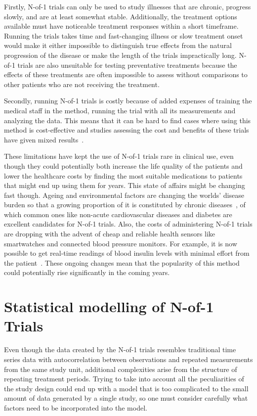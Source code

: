 \documentclass[12pt,a4paper,leqno]{report}
\theoremstyle{plain}
\theoremstyle{definition}
\theoremstyle{remark}
\begin{document}
Firstly, N-of-1 trials can only be used to study illnesses that are chronic,
progress slowly, and are at least somewhat stable. Additionally, the treatment options
available must have noticeable treatment responses within a short timeframe.
Running the trials takes time and fast-changing illness or slow
treatment onset would make it either impossible to distinguish true effects from
the natural progression of the disease or make the length of the trials
impractically long. N-of-1 trials are also unsuitable for testing
preventative treatments because the effects of these treatments are often
impossible to assess without comparisons to other patients who are not receiving
the treatment.\ \cite{nofone}

Secondly, running N-of-1 trials is costly because of added expenses of training
the medical staff in the method, running the trial with all its measurements and
analyzing the data. This means that it can be hard to find cases where using
this method is cost-effective and studies assessing the cost and benefits of these trials
have given mixed results\ \cite{costs}.

These limitations have kept the use of N-of-1 trials rare in clinical use, even
though they could potentially both increase the life quality of the patients and
lower the healthcare costs by finding the most suitable medications to patients that
might end up using them for years. This state of affairs might be
changing fast though. Ageing and environmental factors are changing the worlds'
disease burden so that a growing proportion of it is constituted by chronic
diseases\ \cite{diseaseburden}, of which common ones like non-acute cardiovascular
diseases and diabetes are excellent candidates for N-of-1 trials. Also, the costs
of administering N-of-1 trials are dropping with the advent of cheap and reliable
health sensors like smartwatches and connected blood pressure monitors. For
example, it is now possible to get real-time readings of
blood insulin levels with minimal effort from the patient\ \cite{cgm}. These
ongoing changes mean that the popularity of this method could potentially rise
significantly in the coming years.

\chapter{Statistical modelling of N-of-1 Trials}\label{modelling}

Even though the data created by the N-of-1 trials resembles traditional time
series data with autocorrelation between observations and repeated measurements
from the same study unit, additional complexities arise from the structure of
repeating treatment periods. Trying to take into account all
the peculiarities of the study design could end up with a model that is too complicated to
the small amount of data generated by a single study, so one must consider
carefully what factors need to be incorporated into the model.
\end{document}
